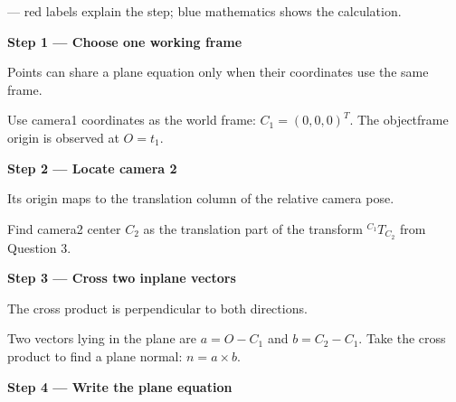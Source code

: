 \documentclass[letterpaper,11pt,english,openany,oneside]{jupyterBook}
\begin{document}
\par\medskip

\sphinxAtStartPar
{} — red labels explain the step; blue mathematics shows the calculation.

\par\medskip{}
{\color{QuizStepRed}\bfseries Step 1 — Choose one working frame}\par\smallskip

\sphinxAtStartPar
{} Points can share a plane equation only when their coordinates use the same frame.

\sphinxAtStartPar
Use camera\sphinxhyphen{}1 coordinates as the world frame: {\color{QuizMathBlue} \(C_1=(0,0,0)^T\)}. The object\sphinxhyphen{}frame origin is observed at {\color{QuizMathBlue} \(O=t_1\)}.

\par

\par\medskip{}
{\color{QuizStepRed}\bfseries Step 2 — Locate camera 2}\par\smallskip

\sphinxAtStartPar
{} Its origin maps to the translation column of the relative camera pose.

\sphinxAtStartPar
Find camera\sphinxhyphen{}2 center {\color{QuizMathBlue} \(C_2\)} as the translation part of the transform {\color{QuizMathBlue} \(^{C_1}T_{C_2}\)} from Question 3.

\par

\par\medskip{}
{\color{QuizStepRed}\bfseries Step 3 — Cross two in\sphinxhyphen{}plane vectors}\par\smallskip

\sphinxAtStartPar
{} The cross product is perpendicular to both directions.

\sphinxAtStartPar
Two vectors lying in the plane are {\color{QuizMathBlue} \(a=O-C_1\)} and {\color{QuizMathBlue} \(b=C_2-C_1\)}. Take the cross product to find a plane normal: {\color{QuizMathBlue} \(\boxed{n=a\times b}\)}.

\par

\par\medskip{}
{\color{QuizStepRed}\bfseries Step 4 — Write the plane equation}\par\smallskip
\end{document}
